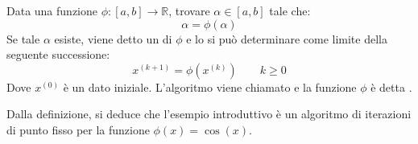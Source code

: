 \begin{definitionbox}
    Data una funzione $\phi: \left[a, b\right] \rightarrow \mathbb{R}$, trovare $\alpha \in \left[a,b\right]$ tale che:
    \begin{equation*}
        \alpha = \phi\left(\alpha\right)
    \end{equation*}
    Se tale $\alpha$ esiste, viene detto un  di $\phi$ e lo si può determinare come limite della seguente successione:
    \begin{equation}\label{eq: successione punto fisso}
        x^{\left(k+1\right)} = \phi\left(x^{\left(k\right)}\right) \hspace{2em} k \ge 0
    \end{equation}
    Dove $x^{\left(0\right)}$ è un dato iniziale. L'algoritmo viene chiamato  e la funzione $\phi$ è detta .
\end{definitionbox}

\noindent
Dalla definizione, si deduce che l'esempio introduttivo è un algoritmo di iterazioni di punto fisso per la funzione $\phi\left(x\right) = \cos\left(x\right)$.

\newpage

